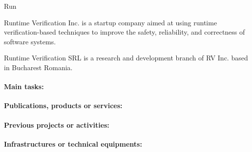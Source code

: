 \begin{sitedescription}{Run}



Runtime Verification Inc. is a startup company aimed at using runtime verification-based
techniques to improve the safety, reliability, and correctness of software systems.

Runtime Verification SRL is a research and development branch of RV Inc. based
in Bucharest Romania.


\paragraph{Main tasks:}



\begin{compactitem}
\item
\end{compactitem}

\paragraph{Publications, products or services:}


\begin{compactitem}
\item 
\end{compactitem}

\paragraph{Previous projects or activities:}


\begin{compactitem}
\item 
\end{compactitem}

\paragraph{Infrastructures or technical equipments:}


\end{sitedescription}
